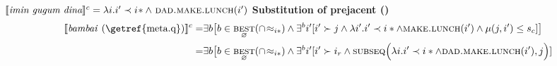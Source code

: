 $\denote[c]{\textit{imin gugum dina}}=\lambda i.i'\prec i\!*\wedge\ \textsc{dad.make.lunch}(i')$
\a \textbf{Substitution of prejacent ()}
\begin{align*}
 	\denote[c]{\textit{bambai \textup{(\getref{meta.q})}}}=&\exists b\big[b\in\underset{\varnothing}{\textsc{best}}(\cap\!\approx_{i*})\wedge \exists^b i'[i'\succ j\wedge \lambda i'.i'\prec i*\wedge\textsc{make.lunch}(i')\wedge\mu(j,i')\leq s_c]\big]\\
	=&\exists b\big[b\in\underset{\varnothing}{\textsc{best}}(\cap\!\approx_{i*})\wedge \exists^b i'[i'\succ i_r\wedge \textsc{subseq}\Big(\lambda i.i'\prec i*\wedge\textsc{dad.make.lunch}(i'),j\Big)]
\end{align*}%

%
%


%


